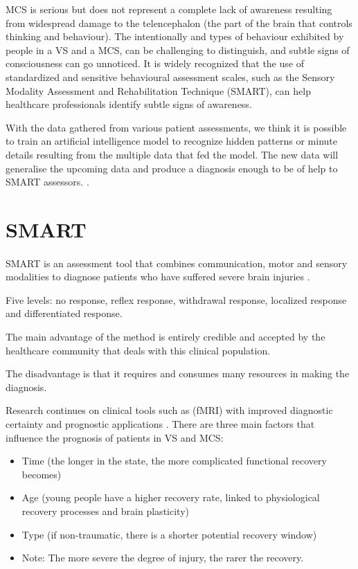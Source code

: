   MCS is serious but does not represent a complete lack of awareness resulting  from widespread damage to the telencephalon (the part of the brain that controls thinking and behaviour).
  The intentionally and types of behaviour exhibited by people in a VS and a MCS,
 can be challenging to distinguish, and subtle signs of consciousness can go unnoticed.
It is widely recognized that the use of standardized and sensitive behavioural assessment scales,
such as the Sensory Modality Assessment and Rehabilitation Technique (SMART), can
help healthcare professionals identify subtle signs of awareness.

With the data gathered from various patient assessments, we think it is possible to train an artificial intelligence model to recognize hidden patterns or minute details resulting from the multiple data that fed the model.
The new data will generalise the upcoming data and produce a diagnosis enough to be of help to SMART assessors. \citep{Yu2018}.



\section{SMART} \label{sec:smart}

\paragraph{}SMART is an assessment tool that combines communication, motor and sensory modalities to diagnose patients who have suffered severe brain injuries \citep{DaConceicaoTeixeira2018}.

Five levels: no response, reflex response, withdrawal response, localized response and differentiated response.

The main advantage of the method is entirely credible and accepted by the healthcare community that deals with this clinical population.


The disadvantage is that it requires and consumes many resources in making the diagnosis.




\espaco




Research continues on clinical tools such as (fMRI) with improved diagnostic certainty and prognostic applications \cite{Bender2015}. There are three main factors that influence the prognosis of patients in VS and MCS:
\begin{itemize}
\item 

Time (the longer in the state, the more complicated functional recovery becomes)

\item Age (young people have a higher recovery rate, linked to physiological recovery processes and brain plasticity)
\item Type (if non-traumatic, there is a shorter potential recovery window)
\item Note: The more severe the degree of injury, the rarer the recovery.
\end{itemize}

